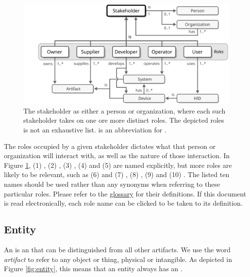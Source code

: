 \begin{figure}[ht!]
  \centering
  \includegraphics[scale=0.9]{figures/stakeholder}
  \caption{
    The stakeholder as either a person or organization, where each such stakeholder takes on one ore more distinct roles.
    The depicted roles is not an exhaustive list.
     is an abbreviation for .
  }
  \label{fig:stakeholder}
\end{figure}

The roles occupied by a given stakeholder dictates what  that person or organization will interact with, as well as the nature of those interaction.
In Figure \ref{fig:stakeholder}, (1) , (2) , (3) , (4)  and (5)  are named explicitly, but more roles are likely to be relevant, such as (6)  and (7) , (8) , (9)  and (10) .
The listed ten names should be used rather than any synonyms when referring to these particular roles.
Please refer to the \hyperref[sec:glossary]{glossary} for their definitions.
If this document is read electronically, each role name can be clicked to be taken to its definition.

\subsection{Entity}
\label{sec:concepts:entity}

An  is an  that can be distinguished from all other artifacts.
We use the word \textit{artifact} to refer to any object or thing, physical or intangible.
As depicted in Figure \ref{fig:entity}, this means that an entity always has an .

